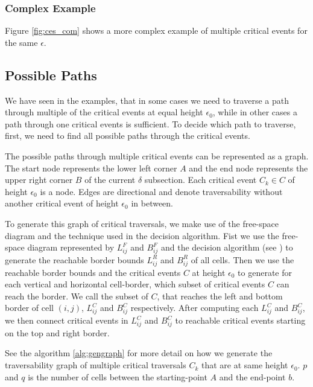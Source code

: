 \subsubsection{Complex Example}

Figure \ref{fig:ces_com} shows a more complex example of multiple critical events for the same $\epsilon$. 






\subsection{Possible Paths}

We have seen in the examples, that in some cases we need to traverse a path through multiple of the critical events at equal height $\epsilon_0$, while in other cases a path through one critical events is sufficient. To decide which path to traverse, first, we need to find all possible paths through the critical events.

The possible paths through multiple critical events can be represented as a graph. The start node represents the lower left corner $A$ and the end node represents the upper right corner $B$ of the current $\delta$ subsection. Each critical event $C_k \in C$ of height $\epsilon_0$ is a node. Edges are directional and denote traversability without another critical event of height $\epsilon_0$ in between.

To generate this graph of critical traversals, we make use of the free-space diagram and the technique used in the decision algorithm. Fist we use the free-space diagram represented by $L_{ij}^F$ and $B_{ij}^F$ and the decision algorithm (see \citet{altgodau}) to generate the reachable border bounds $L_{ij}^R$ and $B_{ij}^R$ of all cells. Then we use the reachable border bounds and the critical events $C$ at height $\epsilon_0$ to generate for each vertical and horizontal cell-border, which subset of critical events $C$ can reach the border. We call the subset of $C$, that reaches the left and bottom border of cell $(i,j)$, $L_{ij}^C$ and $B_{ij}^C$ respectively. After computing each $L_{ij}^C$ and $B_{ij}^C$, we then connect critical events in $L_{ij}^C$ and $B_{ij}^C$ to reachable critical events starting on the top and right border.

See the algorithm \ref{alg:gengraph} for more detail on how we generate the traversability graph of multiple critical traversals $C_k$ that are at same height $\epsilon_0$. $p$ and $q$ is the number of cells between the starting-point $A$ and the end-point $b$.


